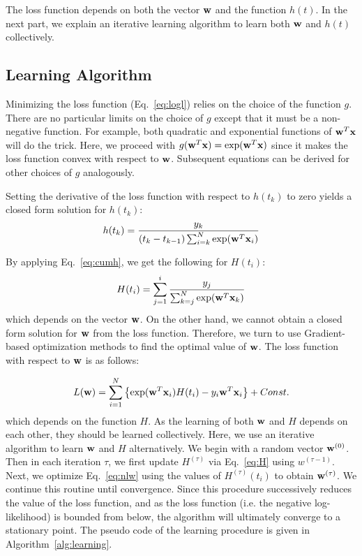 The loss function depends on both the vector $\mathbf{w}$ and the function $h(t)$. In the next part, we explain an iterative learning algorithm to learn both $\mathbf{w}$ and $h(t)$ collectively.

\subsection{Learning Algorithm}
Minimizing the loss function (Eq.~\ref{eq:logl}) relies on the choice of the function $g$. There are no particular limits on the choice of $g$ except that it must be a non-negative function. For example, both quadratic and exponential functions of $\mathbf{w}^T\mathbf{x}$ will do the trick. Here, we proceed with $g(\mathbf{w}^T\mathbf{x})=\exp(\mathbf{w}^T\mathbf{x})$ since it makes the loss function convex with respect to $\mathbf{w}$. Subsequent equations can be derived for other choices of $g$ analogously.

Setting the derivative of the loss function with respect to $h(t_k)$ to zero yields a closed form solution for $h(t_k)$:
\begin{equation}\label{eq:h}
h(t_k)=\frac{y_k}{(t_k-t_{k-1})\sum_{i=k}^{N}\exp(\mathbf{w}^T\mathbf{x}_i)}
\end{equation}

By applying Eq.~\ref{eq:cumh}, we get the following for $H(t_i)$:
\begin{equation}\label{eq:H}
H(t_i)=\sum_{j=1}^{i}\frac{y_j}{\sum_{k=j}^{N}\exp(\mathbf{w}^T\mathbf{x}_k)}
\end{equation}
which depends on the vector $\mathbf{w}$. On the other hand, we cannot obtain a closed form solution for $\mathbf{w}$ from the loss function. Therefore, we turn to use Gradient-based optimization methods to find the optimal value of $\mathbf{w}$. The loss function with respect to $\mathbf{w}$ is as follows:

\begin{equation}\label{eq:nlw}
L(\mathbf{w})=\sum_{i=1}^{N}\left\lbrace\exp(\mathbf{w}^T\mathbf{x}_i)H(t_i)-y_i\mathbf{w}^T\mathbf{x}_i\right\rbrace + Const.
\end{equation}
which depends on the function $H$. As the learning of both $\mathbf{w}$ and $H$ depends on each other, they should be learned collectively. Here, we use an iterative algorithm to learn $\mathbf{w}$ and $H$ alternatively. We begin with a random vector $\mathbf{w}^{(0)}$. Then in each iteration $\tau$, we first update $H^{(\tau)}$ via Eq.~\ref{eq:H} using $w^{(\tau-1)}$. Next, we optimize Eq.~\ref{eq:nlw} using the values of $H^{(\tau)}(t_i)$ to obtain $\mathbf{w}^{(\tau)}$. We continue this routine until convergence. Since this procedure successively reduces the value of the loss function, and as the loss function (i.e. the negative log-likelihood) is bounded from below, the algorithm will ultimately converge to a stationary point. The pseudo code of the learning procedure is given in Algorithm~\ref{alg:learning}.


